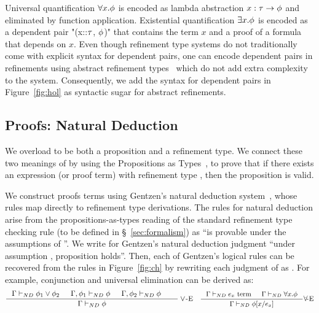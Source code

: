 %
Universal quantification $\forall x. \phi$
is encoded as lambda abstraction $x:\tau \rightarrow \phi$
and eliminated by function application.
%
Existential quantification $\exists x. \phi$
is encoded as a dependent pair "(x::$\tau$, $\phi$)"
that contains the term $x$ and a proof of a formula
that depends on $x$.
%
Even though refinement type systems do not
traditionally come with explicit syntax for
dependent pairs, one can encode dependent
pairs in refinements using abstract
refinement types~\cite{Vazou13}
which do not add extra complexity
to the system.
%
Consequently, we add the syntax for
dependent pairs in Figure~\ref{fig:hol}
as syntactic sugar for abstract refinements.



\subsection{Proofs: Natural Deduction}

We overload \formula to be both a proposition and
a refinement type.
%
We connect these two meanings of \formula by
using the Propositions as Types~\cite{Wadler15},
to prove that if there exists an expression (or proof term) with
refinement type \formula, then the proposition
\formula is valid.
%

We construct proofs terms using Gentzen's
natural deduction system~\cite{Gentzen35},
whose rules map directly to refinement type
derivations.
%
The rules for natural deduction arise from the propositions-as-types reading
of the standard refinement type
checking rule (to be defined in
\S~\ref{sec:formalism}) 
as ``\formula is provable under the assumptions of \env''.
%
We write \gentzenValid{\env}{\formula}
for Gentzen's natural deduction judgment
``under assumption \env, proposition \formula holds''.
%
Then, each of Gentzen's logical rules
can be recovered from the rules in
Figure~\ref{fig:ch} by rewriting
each judgment 
of \corelan as \gentzenValid{\env}{\formula}.
%
For example, conjunction and universal
elimination can be derived as:
%
$$
\inference{
	\gentzenValid{\env}{{\formula_1} \lor{\formula_2}} &&
	\gentzenValid{\env,\formula_1}{\formula} &&
	\gentzenValid{\env,\formula_2}{\formula} &&
}{
	\gentzenValid{\env}{\formula}
}
\lor\small{\textsc{\!-E}}
\quad
\inference{
	\gentzenValid{\env}{e_x\ \text{term}} &&
	\gentzenValid{\env}{\forall x. \formula}
}{
	\gentzenValid{\env}{\formula\subst{x}{e_x}}
}
\forall\small{\textsc{\!-E}}
$$


